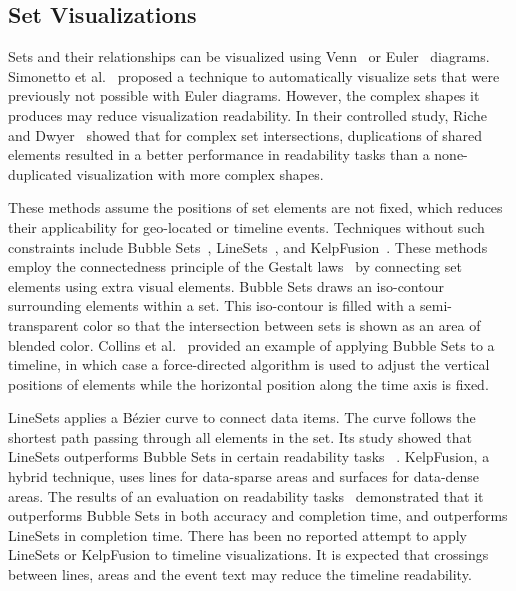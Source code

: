 \subsection{Set Visualizations}
Sets and their relationships can be visualized using Venn~\cite{Ruskey1997} or Euler~\cite{Rodgers2014} diagrams. Simonetto et al.~\cite{Simonetto2009} proposed a technique to automatically visualize sets that were previously not possible with Euler diagrams. However, the complex shapes it produces may reduce visualization readability. In their controlled study, Riche and Dwyer~\cite{Riche2010} showed that for complex set intersections, duplications of shared elements resulted in a better performance in readability tasks than a none-duplicated visualization with more complex shapes. 

These methods assume the positions of set elements are not fixed, which reduces their applicability for geo-located or timeline events. Techniques without such constraints include Bubble Sets~\cite{Collins2009a}, LineSets~\cite{Alper2011}, and KelpFusion~\cite{Meulemans2013}. These methods employ the connectedness principle of the Gestalt laws~\cite{Palmer1994} by connecting set elements using extra visual elements. Bubble Sets draws an iso-contour surrounding elements within a set. This iso-contour is filled with a semi-transparent color so that the intersection between sets is shown as an area of blended color. Collins et al.~\cite{Collins2009a} provided an example of applying Bubble Sets to a timeline, in which case a force-directed algorithm is used to adjust the vertical positions of elements while the horizontal position along the time axis is fixed. 

LineSets applies a B\'{e}zier curve to connect data items. The curve follows the shortest path passing through all elements in the set. Its study showed that LineSets outperforms Bubble Sets in certain readability tasks ~\cite{Alper2011}. KelpFusion, a hybrid technique, uses lines for data-sparse areas and surfaces for data-dense areas. The results of an evaluation on readability tasks~\cite{Meulemans2013} demonstrated that it outperforms Bubble Sets in both accuracy and completion time, and outperforms LineSets in completion time. There has been no reported attempt to apply LineSets or KelpFusion to timeline visualizations. It is expected that crossings between lines, areas and the event text may reduce the timeline readability.